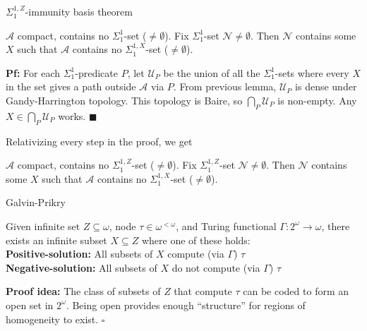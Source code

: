 \begin{frame}{$\Sigma_1^{1,Z}$-immunity basis theorem}
  \begin{thm}
    $\mathcal{A}$ compact, contains no $\Sigma_1^{1}$-set
    ($\neq\emptyset$). Fix $\Sigma_1^{1}$-set
    $\mathcal{N}\neq\emptyset$. Then $\mathcal{N}$ contains some $X$ such
    that $\mathcal{A}$ contains no $\Sigma_1^{1,X}$-set ($\neq\emptyset$).
  \end{thm}
  \textbf{Pf:} For each $\Sigma_1^{1}$-predicate $P$, let $\mathcal{U}_P$
  be the union of all the $\Sigma_1^{1}$-sets where every $X$ in the set
  gives a path outside $\mathcal{A}$ via $P$. From previous lemma,
  $\mathcal{U}_P$ is dense under Gandy-Harrington topology. This topology
  is Baire, so $\bigcap_P\mathcal{U}_P$ is non-empty. Any
  $X\in\bigcap_P\mathcal{U}_P$ works. $\blacksquare$

  \vspace{1em}
  Relativizing every step in the proof, we get
  \begin{coro}
    $\mathcal{A}$ compact, contains no $\Sigma_1^{1,Z}$-set
    ($\neq\emptyset$). Fix $\Sigma_1^{1,Z}$-set
    $\mathcal{N}\neq\emptyset$. Then $\mathcal{N}$ contains some $X$ such
    that $\mathcal{A}$ contains no $\Sigma_1^{1,X}$-set ($\neq\emptyset$).
  \end{coro}
\end{frame}

\begin{frame}{Galvin-Prikry}
  \begin{fact*}
    Given infinite set $Z\subseteq\omega$, node $\tau\in\omega^{<\omega}$,
    and Turing functional $\Gamma:2^\omega\rightarrow\omega$, there exists
    an infinite subset $X\subseteq Z$ where one of these holds:\\
    \textbf{Positive-solution:} All subsets of $X$ compute (via $\Gamma$)
    $\tau$ \\
    \textbf{Negative-solution:} All subsets of $X$ do not compute (via
    $\Gamma$) $\tau$
  \end{fact*}

  \vspace{1em}
  \textbf{Proof idea:} The class of subsets of $Z$ that
  compute $\tau$ can be coded to form an open set in $2^\omega$. Being
  open provides enough ``structure'' for regions of homogeneity to exist.
  $\square$
\end{frame}

